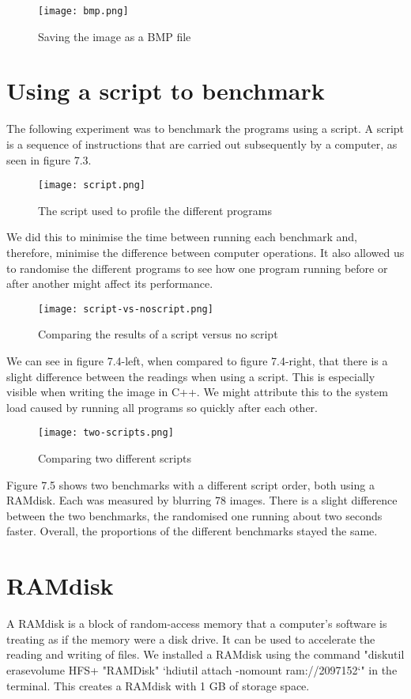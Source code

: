 \begin{figure}[H]
	\centering
	\texttt{[image: bmp.png]}
	\caption{Saving the image as a BMP file}
	\label{figure:bmp}
\end{figure}

\section{Using a script to benchmark}
The following experiment was to benchmark the programs using a script. A script is a sequence of instructions that are carried out subsequently by a computer, as seen in figure 7.3.

\begin{figure}[H]
	\centering
	\texttt{[image: script.png]}
	\caption{The script used to profile the different programs}
	\label{figure:script}
\end{figure}

We did this to minimise the time between running each benchmark and, therefore, minimise the difference between computer operations. It also allowed us to randomise the different programs to see how one program running before or after another might affect its performance.

\begin{figure}[H]
	\centering
	\texttt{[image: script-vs-noscript.png]}
	\caption{Comparing the results of a script versus no script}
	\label{figure:script-vs-noscript}
\end{figure}

We can see in figure 7.4-left, when compared to figure 7.4-right, that there is a slight difference between the readings when using a script. This is especially visible when writing the image in C++. We might attribute this to the system load caused by running all programs so quickly after each other.

\begin{figure}[H]
	\centering
	\texttt{[image: two-scripts.png]}
	\caption{Comparing two different scripts}
	\label{figure:two-scripts}
\end{figure}

Figure 7.5 shows two benchmarks with a different script order, both using a RAMdisk. Each was measured by blurring 78 images. There is a slight difference between the two benchmarks, the randomised one running about two seconds faster. Overall, the proportions of the different benchmarks stayed the same.

\section{RAMdisk}
A RAMdisk is a block of random-access memory that a computer's software is treating as if the memory were a disk drive. It can be used to accelerate the reading and writing of files. We installed a RAMdisk using the command "diskutil erasevolume HFS+ "RAMDisk" `hdiutil attach -nomount ram://2097152`" in the terminal. This creates a RAMdisk with 1 GB of storage space.

